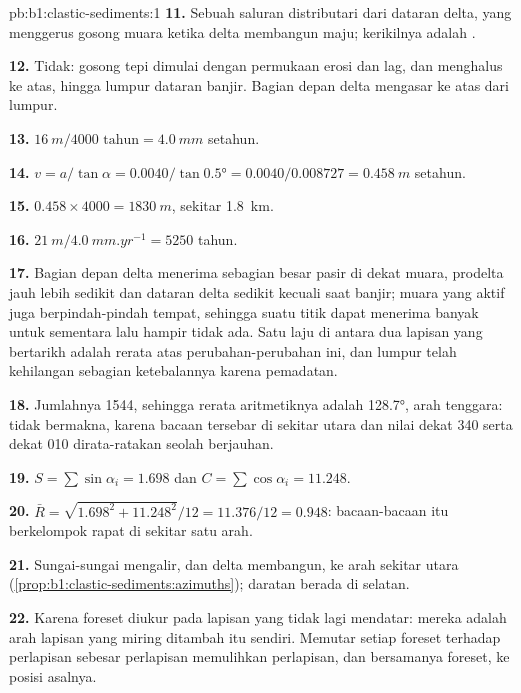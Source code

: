 \begin{solution}{pb:b1:clastic-sediments:1}
\textbf{11.} Sebuah saluran distributari dari dataran delta, yang menggerus gosong muara ketika delta membangun maju; kerikilnya adalah .

\textbf{12.} Tidak: gosong tepi dimulai dengan permukaan erosi dan lag, dan menghalus ke atas, hingga lumpur dataran banjir. Bagian depan delta mengasar ke atas dari lumpur.

\textbf{13.} $\qty{16}{m}/\num{4000}\text{ tahun} = \qty{4.0}{mm}$ setahun.

\textbf{14.} $v = a/\tan\alpha = 0.0040/\tan\ang{0.5} = 0.0040/0.008727 =
\qty{0.458}{m}$ setahun.

\textbf{15.} $0.458 \times 4000 = \qty{1830}{m}$, sekitar \qty{1.8}{km}.

\textbf{16.} $\qty{21}{m}/\qty{4.0}{mm.yr^{-1}} = 5250$ tahun.

\textbf{17.} Bagian depan delta menerima sebagian besar pasir di dekat muara, prodelta jauh lebih sedikit dan dataran delta sedikit kecuali saat banjir; muara yang aktif juga berpindah-pindah tempat, sehingga suatu titik dapat menerima banyak untuk sementara lalu hampir tidak ada. Satu laju di antara dua lapisan yang bertarikh adalah rerata atas perubahan-perubahan ini, dan lumpur telah kehilangan sebagian ketebalannya karena pemadatan.

\textbf{18.} Jumlahnya 1544, sehingga rerata aritmetiknya adalah \ang{128.7}, arah tenggara: tidak bermakna, karena bacaan tersebar di sekitar utara dan nilai dekat 340 serta dekat 010 dirata-ratakan seolah berjauhan.

\textbf{19.} $S = \sum\sin\alpha_i = 1.698$ dan $C = \sum\cos\alpha_i =
11.248$.

\textbf{20.} $\bar R = \sqrt{1.698^2 + 11.248^2}/12 = 11.376/12 = 0.948$: bacaan-bacaan itu berkelompok rapat di sekitar satu arah.

\textbf{21.} Sungai-sungai mengalir, dan delta membangun, ke arah sekitar utara (\cref{prop:b1:clastic-sediments:azimuths}); daratan berada di selatan.

\textbf{22.} Karena foreset diukur pada lapisan yang tidak lagi mendatar:  mereka adalah arah lapisan yang miring ditambah  itu sendiri. Memutar setiap foreset terhadap  perlapisan sebesar  perlapisan memulihkan perlapisan, dan bersamanya foreset, ke posisi asalnya.


\end{solution}
